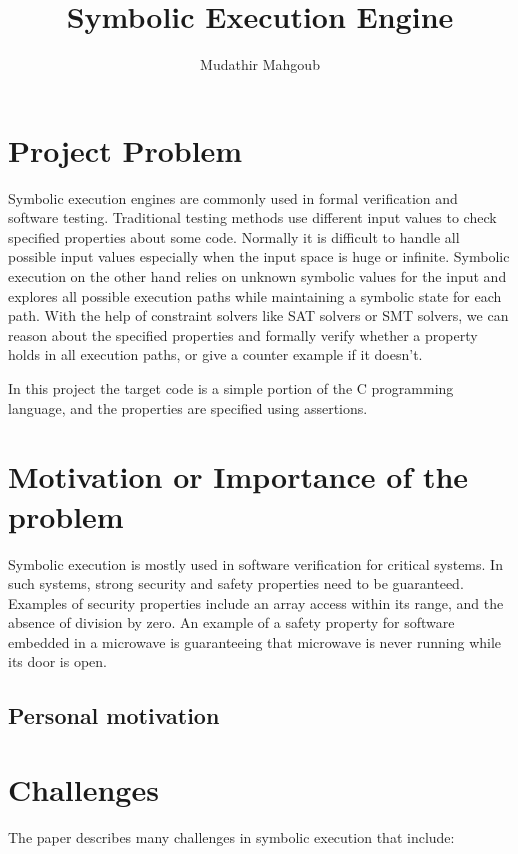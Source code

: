 \documentclass[12pt,a4paper]{article}
\author{Mudathir Mahgoub}
\title{Symbolic Execution Engine}
\begin{document}
\maketitle

\section {Project Problem}

Symbolic execution engines are commonly used in formal verification and software testing. Traditional testing methods use different input values to check specified properties about some code. Normally it is difficult to handle all possible input values especially when the input space is huge or infinite. Symbolic execution on the other hand relies on unknown symbolic values for the input and explores all possible execution paths while maintaining a symbolic state for each path. With the help of constraint solvers like SAT solvers or SMT solvers, we can reason about the specified properties and formally verify whether a property holds in all execution paths, or give a counter example if it doesn't. 

In this project the target code is a simple portion of the C programming language, and the properties are specified using assertions. 

\section{Motivation or Importance of the problem}

Symbolic execution is mostly used in software verification for critical systems. In such systems, strong security and safety properties need to be guaranteed. Examples of security properties include an array access within its range, and the absence of division by zero. An example of a safety property for software embedded in a microwave is guaranteeing that microwave is never running while its door is open. 

\subsection{Personal motivation}

\section{Challenges} 

The paper \cite{paper} describes many challenges in symbolic execution that include:
\end{document}
